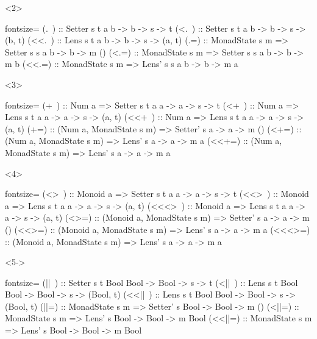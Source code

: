 \documentclass{beamer}
\begin{document}
{\begin{frame}[fragile]
  \begin{onlyenv}<2>
\begin{haskellcode*}{fontsize=\small}
   (.~) :: Setter s t a b -> b -> s ->     t
  (<.~) :: Setter s t a b -> b -> s -> (b, t)
 (<<.~) :: Lens   s t a b -> b -> s -> (a, t)
   (.=) :: MonadState s m => Setter s s a b -> b -> m ()
  (<.=) :: MonadState s m => Setter s s a b -> b -> m b
 (<<.=) :: MonadState s m => Lens'  s s a b -> b -> m a
\end{haskellcode*}
  \end{onlyenv}

  \begin{onlyenv}<3>
\begin{haskellcode*}{fontsize=\small}
   (+~) ::  Num a => Setter s t a a -> a -> s ->     t
  (<+~) ::  Num a => Lens   s t a a -> a -> s -> (a, t)
 (<<+~) ::  Num a => Lens   s t a a -> a -> s -> (a, t)
   (+=) :: (Num a, MonadState s m) => Setter' s a -> a -> m ()
  (<+=) :: (Num a, MonadState s m) => Lens'   s a -> a -> m a
 (<<+=) :: (Num a, MonadState s m) => Lens'   s a -> a -> m a
\end{haskellcode*}
  \end{onlyenv}

  \begin{onlyenv}<4>
\begin{haskellcode*}{fontsize=\small}
  (<>~) ::  Monoid a => Setter s t a a -> a -> s ->     t
 (<<>~) ::  Monoid a => Lens   s t a a -> a -> s -> (a, t)
(<<<>~) ::  Monoid a => Lens   s t a a -> a -> s -> (a, t)
  (<>=) :: (Monoid a, MonadState s m) => Setter' s a -> a -> m ()
 (<<>=) :: (Monoid a, MonadState s m) => Lens'   s a -> a -> m a
(<<<>=) :: (Monoid a, MonadState s m) => Lens'   s a -> a -> m a
\end{haskellcode*}
  \end{onlyenv}

  \begin{onlyenv}<5->
\begin{haskellcode*}{fontsize=\small}
  (||~) :: Setter s t Bool Bool -> Bool -> s ->        t
 (<||~) :: Lens   s t Bool Bool -> Bool -> s -> (Bool, t)
(<<||~) :: Lens   s t Bool Bool -> Bool -> s -> (Bool, t)
  (||=) :: MonadState s m => Setter' s Bool -> Bool -> m ()
 (<||=) :: MonadState s m => Lens'   s Bool -> Bool -> m Bool
(<<||=) :: MonadState s m => Lens'   s Bool -> Bool -> m Bool
\end{haskellcode*}
  \end{onlyenv}


\end{frame}}
\end{document}

